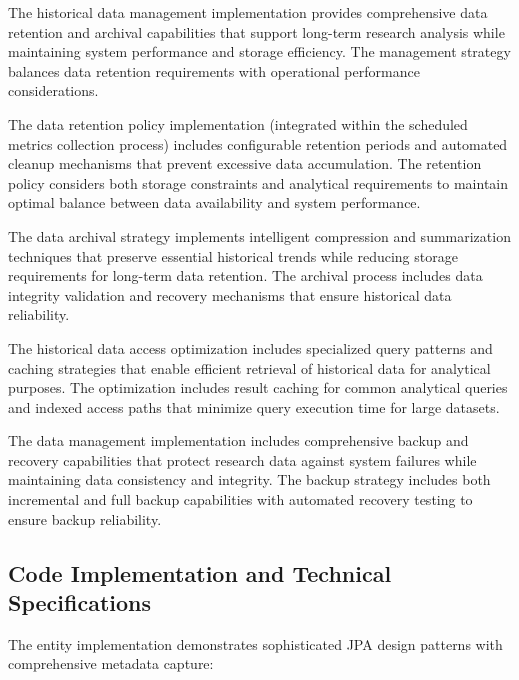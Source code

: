 The historical data management implementation provides comprehensive data retention and archival capabilities that support long-term research analysis while maintaining system performance and storage efficiency. The management strategy balances data retention requirements with operational performance considerations.

The data retention policy implementation (integrated within the scheduled metrics collection process) includes configurable retention periods and automated cleanup mechanisms that prevent excessive data accumulation. The retention policy considers both storage constraints and analytical requirements to maintain optimal balance between data availability and system performance.

The data archival strategy implements intelligent compression and summarization techniques that preserve essential historical trends while reducing storage requirements for long-term data retention. The archival process includes data integrity validation and recovery mechanisms that ensure historical data reliability.

The historical data access optimization includes specialized query patterns and caching strategies that enable efficient retrieval of historical data for analytical purposes. The optimization includes result caching for common analytical queries and indexed access paths that minimize query execution time for large datasets.

The data management implementation includes comprehensive backup and recovery capabilities that protect research data against system failures while maintaining data consistency and integrity. The backup strategy includes both incremental and full backup capabilities with automated recovery testing to ensure backup reliability.

\subsection{Code Implementation and Technical Specifications}

The entity implementation demonstrates sophisticated JPA design patterns with comprehensive metadata capture:


